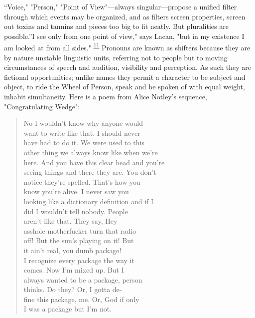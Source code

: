 \documentclass[
]{memoir}
\begin{document}
``Voice," "Person," "Point of View"---always singular---propose a
unified filter through which events may be organized, and as filters
screen properties, screen out toxins and tannins and pieces too big to
fit neatly. But pluralities are possible.''I see only from one point of
view," says Lacan, "but in my existence I am looked at from all sides."
\textsuperscript{\protect\hyperlink{WC11}{11}}
\protect\hypertarget{text11}{}{}Pronouns are known as shifters because
they are by nature unstable linguistic units, referring not to people
but to moving circumstances of speech and audition, visibility and
perception. As such they are fictional opportunities; unlike names they
permit a character to be subject and object, to ride the Wheel of
Person, speak and be spoken of with equal weight, inhabit simultaneity.
Here is a poem from Alice Notley's sequence, "Congratulating Wedge":

\begin{verse}
No I wouldn’t know why anyone would\\
want to write like that. I should never\\
have had to do it. We were used to this\\
other thing we always know like when we’re\\
here. And you have this clear head and you’re\\
seeing things and there they are. You don’t\\
notice they’re spelled. That's how you\\
know you’re alive. I never saw you\\
looking like a dictionary definition and if I\\
did I wouldn’t tell nobody. People\\
aren’t like that. They say, Hey\\
asshole motherfucker turn that radio\\
off! But the sun’s playing on it! But\\
it ain’t real, you dumb package!\\
I recognize every package the way it\\
comes. Now I’m mixed up. But I\\
always wanted to be a package, person\\
thinks. Do they? Or, I gotta de-\\
fine this package, me. Or, God if only\\
I was a package but I’m not.\\
\end{verse}
\end{document}
